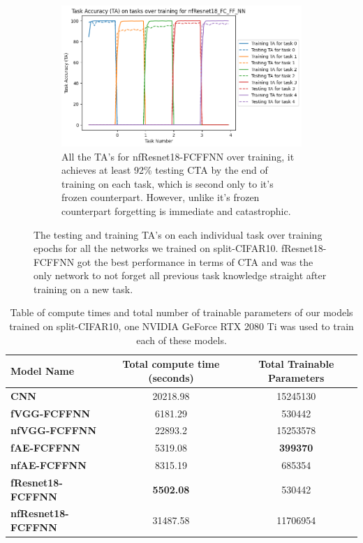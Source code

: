 \begin{figure}[ht]
    \begin{subfigure}[t]{0.4\textwidth}
      \includegraphics[width=\linewidth]{images/CIFAR10_CL/nfResnet18_FC_FF_NN_TA_task.png}
      \caption{All the TA's for nfResnet18-FCFFNN over training, it achieves at least 92\% testing CTA by the end of training on each task, which is second only to it's frozen counterpart. However, unlike it's frozen counterpart forgetting is immediate and catastrophic.}
   \end{subfigure}
    
    \caption{The testing and training TA's on each individual task over training epochs for all the networks we trained on split-CIFAR10. fResnet18-FCFFNN got the best performance in terms of CTA and was the only network to not forget all previous task knowledge straight after training on a new task.}
    \label{fig:CIFAR10-CL-TA}
\end{figure}

\begin{table}[ht]
    \centering
    \begin{tabular}{l c c}
    \toprule
    \textbf{Model Name} & \textbf{Total compute time (seconds)} & \textbf{Total Trainable Parameters} \\
    \midrule
    \textbf{CNN} & 20218.98 & 15245130 \\
    \textbf{fVGG-FCFFNN} & 6181.29 & 530442 \\
    \textbf{nfVGG-FCFFNN} & 22893.2 & 15253578 \\
    \textbf{fAE-FCFFNN} & 5319.08 & \textbf{399370} \\
    \textbf{nfAE-FCFFNN} & 8315.19 & 685354 \\
    \textbf{fResnet18-FCFFNN} & \textbf{5502.08} & 530442 \\
    \textbf{nfResnet18-FCFFNN} & 31487.58 & 11706954 \\
    \bottomrule
    \end{tabular}
    \caption{Table of compute times and total number of trainable parameters of our models trained on split-CIFAR10, one NVIDIA GeForce RTX 2080 Ti was used to train each of these models.}
    \label{tab:compute_times}
\end{table}

